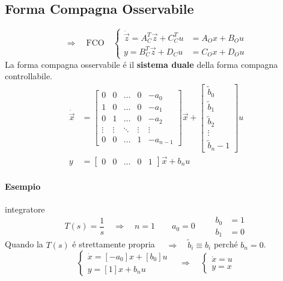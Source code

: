 \documentclass[../main.tex]{subfiles}
\begin{document}
	\subsection{Forma Compagna Osservabile}
		\[
			\Rightarrow\quad\text{FCO}\quad
			\begin{cases}
				\dot{\vec z} = A_C^T \vec z + C_C^T u &= A_O x + B_O u\\
				y = B_C^T \vec z + D_C u &= C_O x + D_O u
			\end{cases}
		\]
		La forma compagna osservabile \'e il \textbf{sistema duale} della forma compagna controllabile.
		\[
			\begin{aligned}
				\dot{\vec x} &=
				\begin{bmatrix}
					0 & 0 & \dots & 0 & -a_0 \\
					1 & 0 & \dots & 0 & -a_1 \\
					0 & 1 & \dots & 0 & -a_2 \\
					\vdots & \vdots & \ddots & \vdots & \vdots \\
					0 & 0 & \dots & 1 & -a_{n-1}
				\end{bmatrix} \vec x+
				\begin{bmatrix}
					\tilde b_0\\
					\tilde b_1\\
					\tilde b_2\\
					\vdots\\
					\tilde b_n-1
				\end{bmatrix} u
				\\
				y &=
				\begin{bmatrix}
					0 & 0 & \dots & 0 & 1
				\end{bmatrix} \vec x + b_n u
			\end{aligned}
		\]
		
		\begin{mdframed}[style=Esempio]
			\paragraph{Esempio} integratore
				\[
					T(s) = \dfrac{1}{s} \quad\Rightarrow\quad n=1 \qquad
					a_0 = 0 \qquad
					\begin{aligned}
						b_0 &= 1\\
						b_1 &= 0
					\end{aligned}
				\]
				Quando la $ T(s) $ \'e strettamente propria $ \quad\Rightarrow\quad \tilde b_i \equiv b_i $ perch\'e $ b_n = 0 $.
				\[
					\begin{cases}
						\dot x = [-a_0] x + [b_0] u\\
						y = [1] x + b_n u
					\end{cases}
					\quad\Rightarrow\quad
					\begin{cases}
						\dot x = u\\
						y = x
					\end{cases}
				\]
		\end{mdframed}
	
\end{document}
